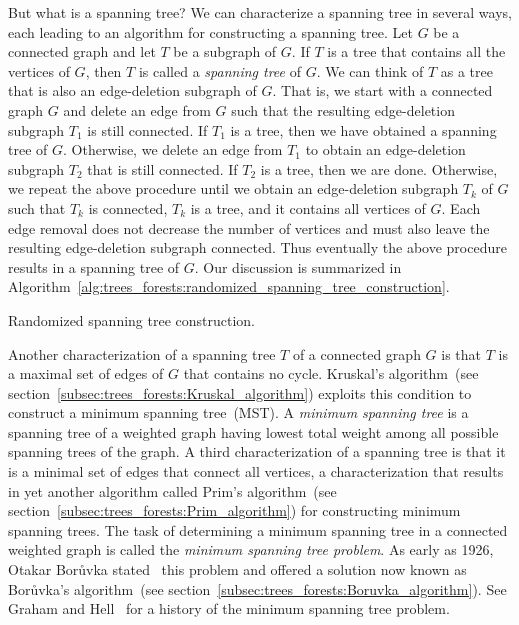 But what is a spanning tree? We can characterize a spanning tree in
several ways, each leading to an algorithm for constructing a spanning
tree. Let $G$ be a connected graph and let $T$ be a subgraph of
$G$. If $T$ is a tree that contains all the vertices of $G$, then $T$
is called a \emph{spanning tree} of $G$. We can think of $T$ as a tree
that is also an edge-deletion subgraph of $G$. That is, we start with
a connected graph $G$ and delete an edge from $G$ such that the
resulting edge-deletion subgraph $T_1$ is still connected. If $T_1$ is
a tree, then we have obtained a spanning tree of $G$. Otherwise, we
delete an edge from $T_1$ to obtain an edge-deletion subgraph $T_2$
that is still connected. If $T_2$ is a tree, then we are
done. Otherwise, we repeat the above procedure until we obtain an
edge-deletion subgraph $T_k$ of $G$ such that $T_k$ is connected,
$T_k$ is a tree, and it contains all vertices of $G$. Each edge
removal does not decrease the number of vertices and must also leave
the resulting edge-deletion subgraph connected. Thus eventually the
above procedure results in a spanning tree of $G$. Our discussion is
summarized in
Algorithm~\ref{alg:trees_forests:randomized_spanning_tree_construction}.

\begin{algorithm}[!htpb]

\caption{Randomized spanning tree construction.}
\label{alg:trees_forests:randomized_spanning_tree_construction}
\end{algorithm}

Another characterization of a spanning tree $T$ of a connected graph
$G$ is that $T$ is a maximal set of edges of $G$ that contains no
cycle. Kruskal's algorithm~(see
section~\ref{subsec:trees_forests:Kruskal_algorithm}) exploits this
condition to construct a minimum spanning tree~(MST). A
\emph{minimum spanning tree} is a
spanning tree of a weighted graph having lowest total weight among all
possible spanning trees of the graph. A third characterization of a
spanning tree is that it is a minimal set of edges that connect all
vertices, a characterization that results in yet another algorithm
called Prim's algorithm~(see
section~\ref{subsec:trees_forests:Prim_algorithm}) for constructing
minimum spanning trees. The task of determining a minimum spanning
tree in a connected weighted graph is called the
\emph{minimum spanning tree problem}. As early as 1926, Otakar
Bor\r{u}vka stated~\cite{Boruvka1926a,Boruvka1926b} this problem and
offered a solution now known as Bor\r{u}vka's algorithm~(see
section~\ref{subsec:trees_forests:Boruvka_algorithm}). See Graham and
Hell~\cite{GrahamHell1985} for a history of the minimum spanning tree
problem.


